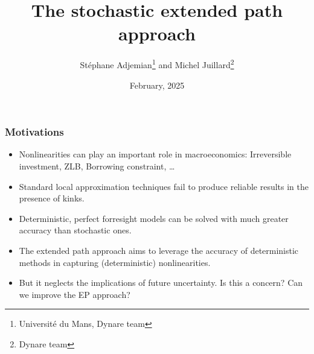 \documentclass{beamer}
\begin{document}


\title{The stochastic extended path approach}
\author{St\'ephane Adjemian\footnote{Universit\'e du Mans, Dynare team} and Michel Juillard\footnote{Dynare team}}
\date{February, 2025}

\begin{frame}
  \titlepage{}
\end{frame}


\begin{frame}
  \frametitle{Motivations}

  \begin{itemize}

  \item Nonlinearities can play an important role in macroeconomics:
    Irreversible investment, ZLB, Borrowing constraint, \ldots\newline

  \item Standard local approximation techniques fail to produce
    reliable results in the presence of kinks.\newline

  \item Deterministic, perfect forresight models can be solved with much
    greater accuracy than stochastic ones.\newline

  \item The extended path approach aims to leverage the accuracy of
    deterministic methods in capturing (deterministic) nonlinearities.\newline

  \item But it neglects the implications of future uncertainty. Is
    this a concern? Can we improve the EP approach?

  \end{itemize}
\end{frame}
\end{document}

